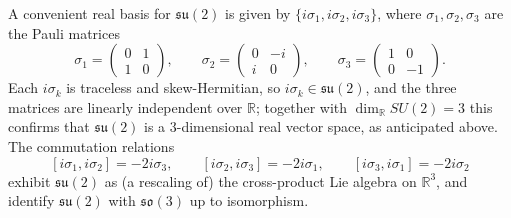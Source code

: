 \begin{example}
    \label{example:pauli-matrices}
    A convenient real basis for \( \mathfrak{su}(2) \) is given by
    \( \{ i\sigma_1, i\sigma_2, i\sigma_3 \} \), where \( \sigma_1,
    \sigma_2, \sigma_3 \) are the
    Pauli matrices
    \[
        \sigma_1 =
        \begin{pmatrix} 0 & 1 \\ 1 & 0
        \end{pmatrix}, \qquad
        \sigma_2 =
        \begin{pmatrix} 0 & -i \\ i & 0
        \end{pmatrix}, \qquad
        \sigma_3 =
        \begin{pmatrix} 1 & 0 \\ 0 & -1
        \end{pmatrix}.
    \]
    Each \( i\sigma_k \) is traceless and skew-Hermitian, so \( i\sigma_k \in
    \mathfrak{su}(2) \), and the three matrices are linearly independent
    over \( \mathbb{R} \); together with \( \dim_{\mathbb{R}} SU(2) = 3 \)
    this confirms that \( \mathfrak{su}(2) \) is a \( 3 \)-dimensional
    real vector space, as anticipated above. The commutation relations
    \[
        [i\sigma_1, i\sigma_2] = -2i\sigma_3, \qquad [i\sigma_2,
        i\sigma_3] = -2i\sigma_1, \qquad
        [i\sigma_3, i\sigma_1] = -2i\sigma_2
    \]
    exhibit \( \mathfrak{su}(2) \) as (a rescaling of) the cross-product
    Lie algebra on \( \mathbb{R}^3 \), and identify \( \mathfrak{su}(2) \)
    with \( \mathfrak{so}(3) \) up to isomorphism.
\end{example}
